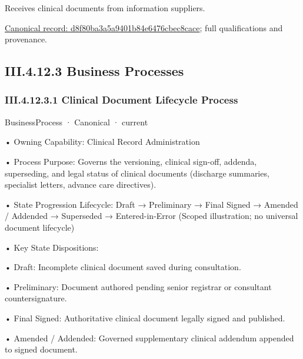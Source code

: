 Receives clinical documents from information suppliers.


{\footnotesize \href{../../../../continuum/business/business-function/d8f80ba3a5a9401b84e6476cbec8cace.md}{Canonical record: d8f80ba3a5a9401b84e6476cbec8cace}; full qualifications and provenance.}\par
\subsection*{III.4.12.3 Business Processes}
\label{navigation:III.4.12.3}

\subsubsection*{III.4.12.3.1 Clinical Document Lifecycle Process}
\label{navigation:III.4.12.3.1}

\label{element:eacdec16b96844b4963b8a960d1a8666}
{\small BusinessProcess · Canonical · current}\par

•
Owning Capability: Clinical Record Administration



•
Process Purpose: Governs the versioning, clinical sign-off, addenda, superseding, and legal status of clinical documents (discharge summaries, specialist letters, advance care directives).



•
State Progression Lifecycle: Draft → Preliminary → Final Signed → Amended / Addended → Superseded → Entered-in-Error   (Scoped illustration; no universal document lifecycle)



•
Key State Dispositions:



•
Draft: Incomplete clinical document saved during consultation.



•
Preliminary: Document authored pending senior registrar or consultant countersignature.



•
Final Signed: Authoritative clinical document legally signed and published.



•
Amended / Addended: Governed supplementary clinical addendum appended to signed document.




